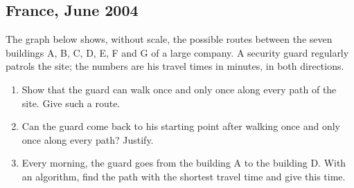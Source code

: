 \begin{center}
\end{center}

\begin{tkzexample}
\end{tkzexample}

\newpage
\subsection{France, June 2004}\label{frj04}
The graph below shows, without scale, the possible routes between the seven
buildings A, B, C, D, E, F and G of a large company. A security guard
regularly patrols the site; the numbers are his travel times in minutes,
in both directions.

\begin{center}
\end{center}

\begin{enumerate}
\item Show that the guard can walk once and only once along every path of
      the site. Give such a route.
\item Can the guard come back to his starting point after walking once and
      only once along every path? Justify.
\item Every morning, the guard goes from the building A to the building D.
      With an algorithm, find the path with the shortest travel time and
      give this time.
\end{enumerate}

